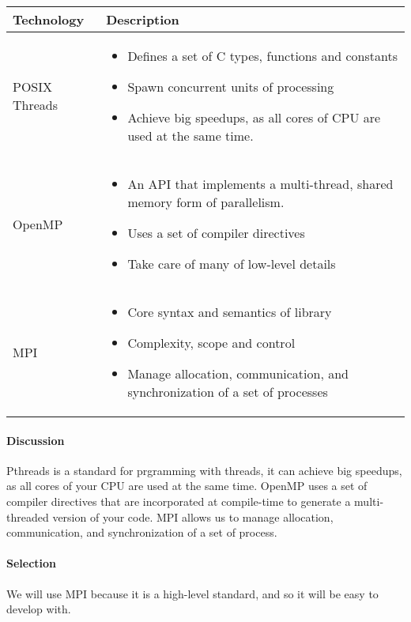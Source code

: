 \begin{center}
  \begin{tabular}{ | l | p{10cm} | }
    \hline
    Technology & Description  \\ \hline

    POSIX Threads \cite{posix-threads} &
    \begin{itemize}
      \item Defines a set of C types, functions and constants 
      \item Spawn concurrent units of processing
      \item Achieve big speedups, as all cores of CPU are used at the same time.
      \end{itemize}\\ \hline

    OpenMP \cite{Openmp} &
    \begin{itemize}
      \item An API that implements a multi-thread, shared memory form of parallelism.
      \item Uses a set of compiler directives 
      \item Take care of many of low-level details
    \end{itemize}\\ \hline

    MPI \cite{mpi} &
    \begin{itemize}
      \item Core syntax and semantics of library
      \item Complexity, scope and control
      \item Manage allocation, communication, and synchronization of a set of processes 
    \end{itemize}\\ \hline
  \end{tabular}

\end{center}

\paragraph{Discussion}

Pthreads is a standard for prgramming with threads, it can achieve big speedups, as all cores of your CPU are used at the same time.
OpenMP uses a set of compiler directives that are incorporated at compile-time to generate a multi-threaded version of your code.
MPI allows us to manage allocation, communication, and synchronization of a set of process.

\paragraph{Selection}

We will use MPI because it is a high-level standard, and so it will be easy to develop with.
